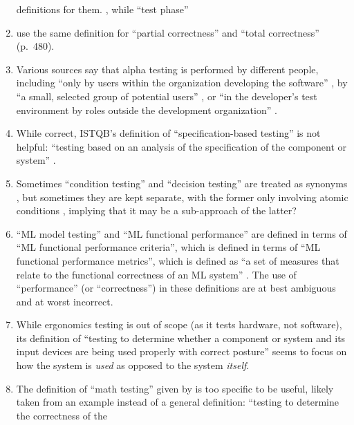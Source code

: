 \begin{enumerate}
            definitions for them. \procLevel{\citeyearpar}, while
            ``test phase'' \phaseDef{}
      \item \citeauthor{IEEE2017} use the same definition for ``partial correctness''
            \citeyearpar[p.~314]{IEEE2017} and ``total correctness'' (p.~480).
      \item Various sources say that alpha testing is performed by different
            people, including ``only by users within the organization
            developing the software'' \citep[p.~17]{IEEE2017}, by ``a small,
            selected group of potential users'' \citep[p.~5-8]{SWEBOK2024}, or
            ``in the developer's test environment by roles outside the
            development organization'' \citepISTQB{}.
      \item While correct, ISTQB's definition of ``specification-based testing''
            is not helpful: ``testing based on an analysis of the specification
            of the component or system'' \citepISTQB{}.
      \item Sometimes ``condition testing'' and ``decision testing'' are treated
            as synonyms \citep[p.~5-13]{SWEBOK2024}, but sometimes they are kept
            separate, with the former only involving atomic conditions
            \citepISTQB{}, implying that it may be a sub-approach of the
            latter?
      \item ``ML model testing'' and ``ML functional performance'' are defined
            in terms of ``ML functional performance criteria'', which is defined
            in terms of ``ML functional performance metrics'', which is defined
            as ``a set of measures that relate to the functional correctness of
            an ML system'' \citepISTQB{}. The use of ``performance'' (or
            ``correctness'') in these definitions are at best ambiguous and at
            worst incorrect.
      \item While ergonomics testing is out of scope (as it tests hardware, not
            software), its definition of ``testing to determine whether a
            component or system and its input devices are being used properly
            with correct posture'' \citepISTQB{} seems to focus on how the
            system is \emph{used} as opposed to the system \emph{itself}.
      \item The definition of ``math testing'' given by \citetISTQB{} is
            too specific to be useful, likely taken from an example instead of
            a general definition: ``testing to determine the correctness of the

\end{enumerate}

